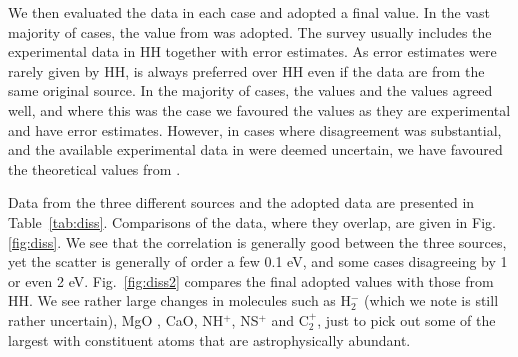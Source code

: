 \documentclass[traditabstract]{aa} %
\begin{document}
We then evaluated the data in each case and adopted a final value.  In the vast majority of cases, the value from \cite{Luo} was adopted.  The \cite{Luo} survey usually includes the experimental data in HH together with error estimates.  As error estimates were rarely given by HH, \cite{Luo} is always preferred over HH even if the data are from the same original source.  In the majority of cases, the \cite{Luo} values and the \cite{1991JChPh..94.7221C} values agreed well, and where this was the case we favoured the \cite{Luo} values as they are experimental and have error estimates.  However, in cases where disagreement was substantial, and the available experimental data in \cite{Luo} were deemed uncertain, we have favoured the theoretical values from \cite{1991JChPh..94.7221C} \citep[see discussion in][]{1994LNP...428..250C}.  


Data from the three different sources and the adopted data are presented in Table~\ref{tab:diss}.  Comparisons of the data, where they overlap, are given in Fig.\ref{fig:diss}.  We see that the correlation is generally good between the three sources, yet the scatter is generally of order a few 0.1 eV, and some cases disagreeing by 1 or even 2 eV.  Fig.~\ref{fig:diss2} compares the final adopted values with those from HH.   We see rather large changes in molecules such as H$_2^-$ (which we note is still rather uncertain), MgO \citep[which was noted by][]{1994LNP...428..250C}, CaO, NH$^+$, NS$^+$ and C$_2^+$, just to pick out some of the largest with constituent atoms that are astrophysically abundant.  
\end{document}
